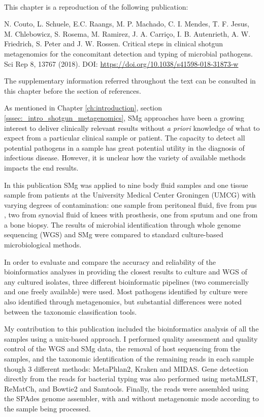 \mbox{}\\
\vspace{8cm}

This chapter is a reproduction of the following publication:

N. Couto, L. Schuele, E.C. Raangs, M. P. Machado, C. I. Mendes, T. F. Jesus, M. Chlebowicz,  S. Rosema, M. Ramirez, J. A. Carriço, I. B. Autenrieth, A. W. Friedrich, S. Peter and J. W. Rossen. Critical steps in clinical shotgun metagenomics for the concomitant detection and typing of microbial pathogens. Sci Rep 8, 13767 (2018). DOI: \url{https://doi.org/10.1038/s41598-018-31873-w}

The supplementary information referred throughout the text can be consulted in this chapter before the section of references. 

As mentioned in Chapter \ref{ch:introduction}, section \ref{sssec:_intro_shotgun_metagenomics}, \ac{SMg} approaches have been a growing interest to deliver clinically relevant results without \textit{a priori} knowledge of what to expect from a particular clinical sample or patient. 
The capacity to detect all potential pathogens in a sample has great potential utility in the diagnosis of infectious disease. 
However, it is unclear how the variety of available methods impacts the end results.

In this publication \ac{SMg} was applied to nine body fluid samples and one tissue sample from patients at the University Medical Center Groningen (UMCG) with varying degrees of contamination: one sample from peritoneal fluid, five from pus , two from synovial fluid of knees with prosthesis, one from sputum and one from a bone biopsy. The results of microbial identification through whole genome sequencing (\ac{WGS}) and \ac{SMg} were compared to standard culture-based microbiological methods. 

In order to evaluate and compare the accuracy and reliability of the bioinformatics analyses in providing the closest results to culture and \ac{WGS} of any cultured isolates, three different bioinformatic pipelines (two commercially and one freely available) were used. Most pathogens identified by culture were also identified through metagenomics, but substantial differences were noted between the taxonomic classification tools. 

My contribution to this publication included the bioinformatics analysis of all the samples using a unix-based approach. I performed quality assessment and quality control of the \ac{WGS} and \ac{SMg} data, the removal of host sequencing from the samples, and the taxonomic identification of the remaining reads in each sample though 3 different methods: MetaPhlan2, Kraken and MIDAS. Gene detection directly from the reads for bacterial typing was also performed using metaMLST, ReMatCh, and Bowtie2 and Samtools. Finally, the reads were assembled using the SPAdes genome assembler, with and without metagenomic mode according to the sample being processed. 

